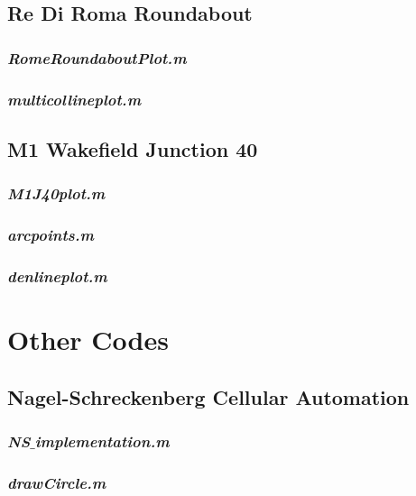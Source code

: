 \subsection{Re Di Roma Roundabout}
\label{code:ReDiRoma}

\subsubsection{\emph{RomeRoundaboutPlot.m}}
	\lstset{style=m}
	
	
\subsubsection{\emph{multicollineplot.m}}
\label{code:multicolline}
	\lstset{style=m}
	
	
\newpage

\subsection{M1 Wakefield Junction 40}
\label{code:m1j40}

\subsubsection{\emph{M1J40plot.m}}

	\lstset{style=m}
	
	
\subsubsection{\emph{arcpoints.m}}
\label{code:arcpoints}
	\lstset{style=m}
	
	
\newpage

\subsubsection{\emph{denlineplot.m}}
\label{code:denlineplot}
	\lstset{style=m}
	
	
\newpage
	
\section{Other Codes}

\subsection{Nagel-Schreckenberg Cellular Automation}
\lstset{inputpath=code/NS/}
\label{code:NaSc}

\subsubsection{\emph{NS$\_$implementation.m}}
	\lstset{style=m}
	

\subsubsection{\emph{drawCircle.m}}
	\lstset{style=m}
	
		
